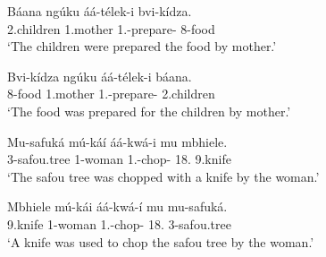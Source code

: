 \documentclass[output=paper,colorlinks,citecolor=brown,
]{langscibook}
\begin{document}
\begin{exe}
    \ex \label{118}
    \begin{xlist}
\ex
\label{118a}
\gll
Báana ngúku áá-télek-i bvi-kídza.\\
2.children 1.mother 1\Sm{}.\Pst{}-prepare-\Pst{} 8-food\\
\trans ‘The children were prepared the food by mother.’

\ex
\label{118b}
\gll
Bvi-kídza ngúku áá-télek-i báana.\\
8-food 1.mother 1\Sm{}.\Pst{}-prepare-\Pst{} 2.children\\
\trans ‘The food was prepared for the children by mother.’

    \end{xlist}
\end{exe}
\begin{exe}
    \ex \label{119}
    \begin{xlist}
\ex
\label{119a}
\gll
Mu-safuká mú-káí áá-kwá-i mu mbhiele.\\
3-safou.tree 1-woman 1\Sm{}.\Pst{}-chop-\Pst{} 18.\Loc{} 9.knife\\
\trans ‘The safou tree was chopped with a knife by the woman.’

\ex
\label{119b}
\gll
Mbhiele mú-kái áá-kwá-í mu mu-safuká.\\
9.knife 1-woman 1\Sm{}.\Pst{}-chop-\Pst{} 18.\Loc{} 3-safou.tree\\
\trans ‘A knife was used to chop the safou tree by the woman.’

    \end{xlist}
\end{exe}
\end{document}
